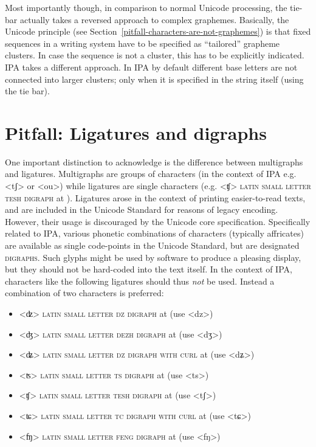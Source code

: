 Most importantly though, in comparison to normal Unicode processing, the tie-bar
actually takes a reversed approach to complex graphemes. Basically, the Unicode
principle (see Section~\ref{pitfall-characters-are-not-graphemes}) is that fixed
sequences in a writing system have to be specified as ``tailored'' grapheme
clusters. In case the sequence is not a cluster, this has to be explicitly
indicated. IPA takes a different approach. In IPA by default different base
letters are not connected into larger clusters; only when it is specified in the
string itself (using the tie bar).

\section{Pitfall: Ligatures and digraphs}
\label{pitfall-ligatures-digraphs}     

One important distinction to acknowledge is the difference between multigraphs
and ligatures. Multigraphs are groups of characters (in the context of IPA e.g.
<tʃ> or <ou>) while ligatures are single characters (e.g. <ʧ> \textsc{latin
small letter tesh digraph} at ). Ligatures arose in the context of
printing easier-to-read texts, and are included in the Unicode Standard for
reasons of legacy encoding. However, their usage is discouraged by the Unicode
core specification. Specifically related to IPA, various phonetic combinations
of characters (typically affricates) are available as single code-points in the
Unicode Standard, but are designated \textsc{digraphs}. Such glyphs might be used by
software to produce a pleasing display, but they should not be hard-coded into
the text itself. In the context of IPA, characters like the following ligatures
should thus \emph{not} be used. Instead a combination of two characters is
preferred:
      
\begin{itemize} 
	\item[] <ʣ> \textsc{latin small letter dz digraph} at  
	  (use <dz>) 
    \item[] <ʤ> \textsc{latin small letter dezh digraph} at 
      (use <dʒ>)
    \item[] <ʥ> \textsc{latin small letter dz digraph with curl} at 
      (use <dʑ>)
    \item[] <ʦ> \textsc{latin small letter ts digraph} at  
      (use <ts>)
	\item[] <ʧ> \textsc{latin small letter tesh digraph} at  
	  (use <tʃ>) 
    \item[] <ʨ> \textsc{latin small letter tc digraph with curl} at 
      (use <tɕ>)
   	\item[] <ʩ> \textsc{latin small letter feng digraph} at 
	  (use <fŋ>) 
\end{itemize}

